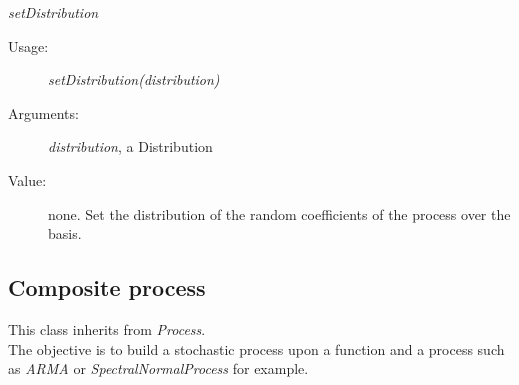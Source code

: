 \begin{description}
\begin{description}
\item \textit{setDistribution}
\begin{description}
\item[Usage:] \textit{setDistribution(distribution)}
\item[Arguments:] \textit{distribution}, a Distribution
\item[Value:] none. Set the distribution of the random coefficients of the process over the basis.
\end{description}
\bigskip

\end{description}

\end{description}


\newpage
\subsection{Composite process}

This class inherits from \textit{Process}. \\
The objective is to build a stochastic process upon a function and a process such as \textit{ARMA} or \textit{SpectralNormalProcess} for example.

